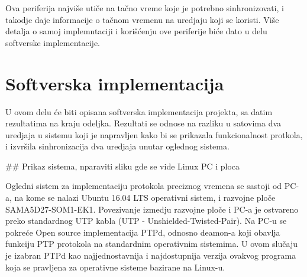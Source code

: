 \documentclass[a4paper,12pt, master]{etf}
\begin{document}
        Ova periferija najvi\v{s}e uti\v{c}e na ta\v{c}no vreme koje je potrebno
        sinhronizovati, i takodje daje informacije o ta\v{c}nom vremenu na uredjaju
        koji se koristi. Vi\v{s}e detalja o samoj implemntaciji i kori\v{s}\'{c}enju
        ove periferije bi\'{c}e dato u delu softverske implementacije.

	\newpage

	\chapter{Softverska implementacija}

        U ovom delu \'{c}e biti opisana softverska implementacija projekta, sa
        datim rezultatima na kraju odeljka. Rezultati se odnose na razliku u
        satovima dva uredjaja u sistemu koji je napravljen kako bi se prikazala
        funkcionalnost protkola, i izvr\v{s}ila sinhronizacija dva uredjaja
        unutar oglednog sistema.

        \#\# Prikaz sistema, nparaviti sliku gde se vide Linux PC i ploca

        Ogledni sistem za implementaciju protokola preciznog vremena se sastoji
        od PC-a, na kome se nalazi Ubuntu 16.04 LTS operativni sistem, i
        razvojne plo\v{c}e SAMA5D27-SOM1-EK1. Povezivanje izmedju razvojne
        plo\v{c}e i PC-a je ostvareno preko standardnog UTP kabla (UTP -
        Unshielded-Twisted-Pair). Na PC-u se pokre\'{c}e Open source
        implementacija PTPd, odnosno deamon-a koji obavlja funkciju PTP
        protokola na standardnim operativnim sistemima. U ovom slu\v{c}aju je
        izabran PTPd kao najjednostavnija i najdostupnija verzija ovakvog
        programa koja se pravljena za operativne sisteme bazirane na Linux-u.
\end{document}
